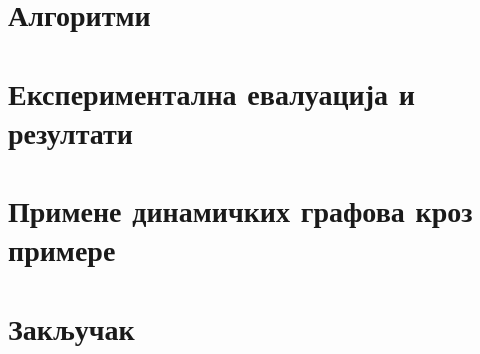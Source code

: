 \documentclass[12pt,oneside]{memoir}
\theoremstyle{definition}
\begin{document}
\label{chp:implementacioni_model}


\chapter{Алгоритми}

\label{chp:algoritmi}


\chapter{Експериментална евалуација и резултати}

\label{chp:eksperimentalna_evaluacija_i_rezultati}


\chapter{Примене динамичких графова кроз примере}

\label{chp:primene}


\chapter{Закључак}

\label{chp:zakljucak}


\literatura

\backmatter
\end{document}
